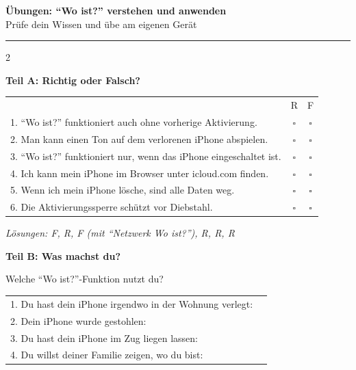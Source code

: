 \documentclass[a4paper,landscape,8pt]{extarticle}
\begin{document}
\newpage


\begin{center}
{\LARGE\bfseries Übungen: ``Wo ist?'' verstehen und anwenden}\\[3pt]
{\normalsize Prüfe dein Wissen und übe am eigenen Gerät}
\end{center}

\vspace{2mm}
\hrule
\vspace{3mm}

\begin{multicols}{2}

\textbf{\large Teil A: Richtig oder Falsch?}

\vspace{2mm}

\renewcommand{\arraystretch}{1.6}
\begin{tabular}{@{}p{8.5cm}cc@{}}
& R & F \\
1. ``Wo ist?'' funktioniert auch ohne vorherige Aktivierung. & $\square$ & $\square$ \\
2. Man kann einen Ton auf dem verlorenen iPhone abspielen. & $\square$ & $\square$ \\
3. ``Wo ist?'' funktioniert nur, wenn das iPhone eingeschaltet ist. & $\square$ & $\square$ \\
4. Ich kann mein iPhone im Browser unter icloud.com finden. & $\square$ & $\square$ \\
5. Wenn ich mein iPhone lösche, sind alle Daten weg. & $\square$ & $\square$ \\
6. Die Aktivierungssperre schützt vor Diebstahl. & $\square$ & $\square$ \\
\end{tabular}
\renewcommand{\arraystretch}{1}

{\footnotesize\textit{Lösungen: F, R, F (mit ``Netzwerk Wo ist?''), R, R, R}}

\vspace{6mm}

\textbf{\large Teil B: Was machst du?}

Welche ``Wo ist?''-Funktion nutzt du?

\vspace{3mm}

\renewcommand{\arraystretch}{1.8}
\begin{tabular}{@{}p{7.5cm}p{4cm}@{}}
1. Du hast dein iPhone irgendwo in der Wohnung verlegt: & \dotfill \\
2. Dein iPhone wurde gestohlen: & \dotfill \\
3. Du hast dein iPhone im Zug liegen lassen: & \dotfill \\
4. Du willst deiner Familie zeigen, wo du bist: & \dotfill \\
\end{tabular}
\renewcommand{\arraystretch}{1}


\end{multicols}
\end{document}
